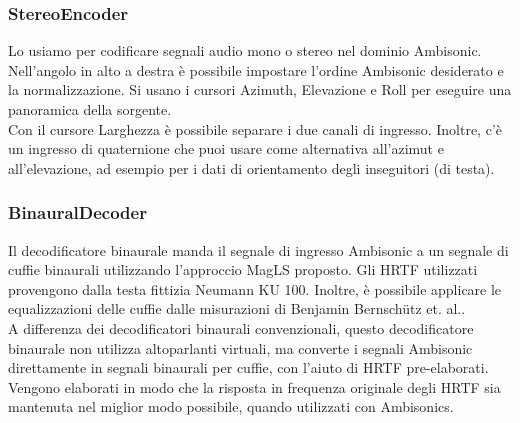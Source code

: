 \subsubsection*{StereoEncoder}

Lo usiamo per codificare segnali audio mono o stereo nel dominio Ambisonic.
Nell'angolo in alto a destra è possibile impostare l'ordine Ambisonic desiderato e la normalizzazione.
Si usano i cursori Azimuth, Elevazione e Roll per eseguire una panoramica della sorgente.\\
Con il cursore Larghezza è possibile separare i due canali di ingresso.
Inoltre, c'è un ingresso di quaternione che puoi usare come alternativa all'azimut e all'elevazione, ad esempio per i dati di orientamento degli inseguitori (di testa).

\subsubsection*{BinauralDecoder}

Il decodificatore binaurale manda il segnale di ingresso Ambisonic a un segnale di cuffie binaurali utilizzando l'approccio MagLS proposto.
 Gli HRTF utilizzati provengono dalla testa fittizia Neumann KU 100. 
 Inoltre, è possibile applicare le equalizzazioni delle cuffie dalle misurazioni di Benjamin Bernschütz et. al..\\
A differenza dei decodificatori binaurali convenzionali, questo decodificatore binaurale non utilizza altoparlanti virtuali, ma converte i segnali Ambisonic direttamente in segnali binaurali per cuffie,
 con l'aiuto di HRTF pre-elaborati.\\
 Vengono elaborati in modo che la risposta in frequenza originale degli HRTF sia mantenuta nel miglior modo possibile, quando utilizzati con Ambisonics.
